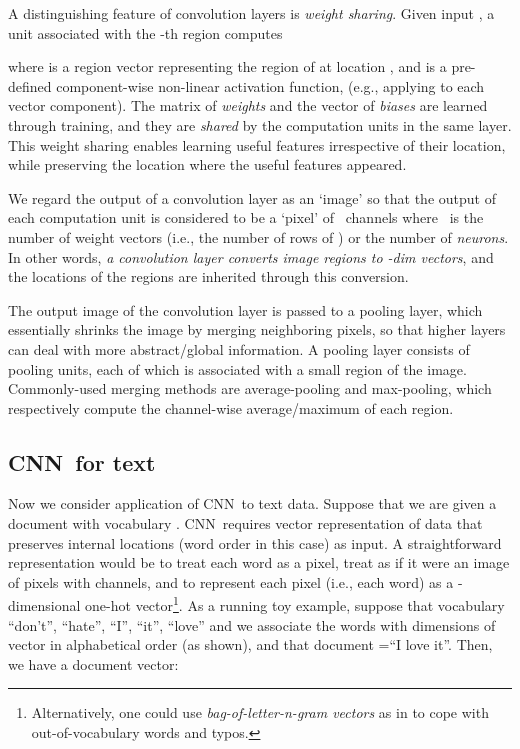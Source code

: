 \documentclass[11pt,letterpaper]{article}
\newcommand{\cnn}{CNN}
\begin{document}
A distinguishing feature of convolution layers is {\em weight sharing}. 
Given input , a unit associated with the -th region computes 

where  is a region vector representing the region of  
at location , 
and  is a pre-defined component-wise non-linear activation function, 
(e.g., applying  to each vector component).  
The matrix of {\em weights}  and the vector of {\em biases}  are 
learned through training, and they are {\em shared} by the computation units 
in the same layer.  
This weight sharing enables learning 
useful features irrespective of their location, while preserving the 
location where the useful features appeared.  

\newcommand{\numNeurono}{m}
\newcommand{\numNeuron}{}
We regard the output of a convolution layer as an `image' so that the output of 
each computation unit is considered to be a `pixel' of \numNeuron\ channels 
where \numNeuron\ is the number of weight vectors (i.e., the number of 
rows of ) or the number of {\em neurons}. 
In other words, {\em a convolution layer converts image regions to 
\numNeuron-dim vectors}, and the locations of the regions are inherited through this conversion.  


The output image of the convolution layer is passed to a pooling layer, 
which essentially shrinks the image by merging neighboring pixels, so that higher layers can deal with 
more abstract/global information.  
A pooling layer consists of pooling units, each of which is associated with a small region 
of the image.  Commonly-used merging methods are average-pooling and max-pooling, 
which respectively compute the channel-wise average/maximum of each region.  






\subsection{\cnn\ for text} 
\label{sec:cnn-text}

Now we consider application of \cnn\ to text data.  
Suppose that we are given a document  with vocabulary 
.  
\cnn\ requires vector representation of data that preserves internal locations (word order in this case) 
as input.  
A straightforward representation 
would be to treat each word as a pixel, treat 
 as if it were an image of  pixels with  channels, 
and to represent each pixel (i.e., each word) as a -dimensional one-hot vector\footnote{
  Alternatively, one could use {\em bag-of-letter-n-gram vectors} as in \cite{Shen+etal14,Gao+etal14} 
  to cope with out-of-vocabulary words and typos.  
}. 
As a running toy example, 
suppose that vocabulary  ``don't'', ``hate'', ``I'', ``it'', ``love''  
and we associate the words with dimensions of vector in alphabetical order (as shown), 
and that document =``I love it''.  
Then, we have a document vector: 
\vspace{-0.1in}
\end{document}
